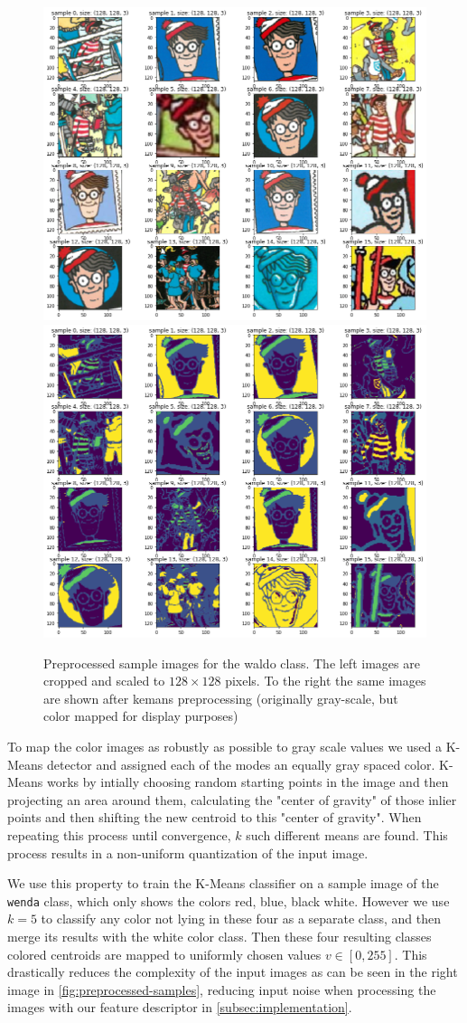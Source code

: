 \documentclass[11pt]{article}
\begin{document}
\begin{figure}
    \centering
    \includegraphics[width=0.4\linewidth]{figures/preprocess_waldo} 
    \hspace{1cm}
    \includegraphics[width=0.4\linewidth]{figures/kmeans_waldo} 
    \caption{Preprocessed sample images for the waldo class. The left images are cropped and scaled to \( 128 \times 128 \) pixels.
    To the right the same images are shown after kemans preprocessing (originally gray-scale, but color mapped for display purposes)}
    \label{fig:preprocessed-samples}
\end{figure}

To map the color images as robustly as possible to gray scale values we used a K-Means detector 
and assigned each of the modes an equally gray spaced color. 
K-Means works by intially choosing random starting points in the image and then projecting an area around them, calculating the "center of gravity"
of those inlier points and then shifting the new centroid to this "center of gravity". When repeating this
process until convergence, \( k \) such different means are found. This process results in a non-uniform quantization of the input image.

We use this property to train the K-Means classifier on a sample image of the \verb|wenda| class, which only 
shows the colors red, blue, black white. However we use \( k=5 \) to classify any color not lying in these four as a separate class, and then merge 
its results with the white color class. Then these four resulting classes colored centroids are mapped to uniformly
chosen values \( v \in [0, 255] \). This drastically reduces the complexity of the input images as can be seen in the right image in \autoref{fig:preprocessed-samples},
reducing input noise when processing the images with our feature descriptor in \autoref{subsec:implementation}.
\end{document}
